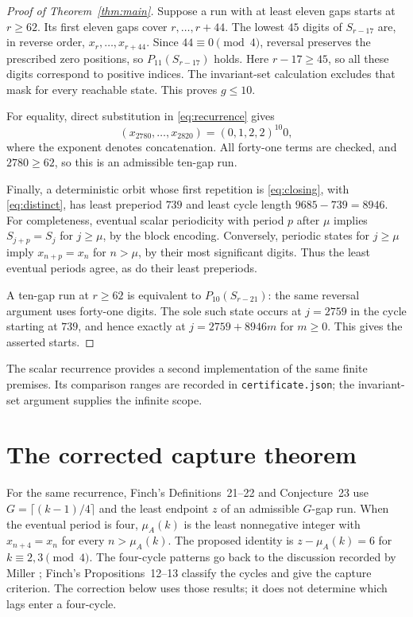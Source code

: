 \documentclass[11pt]{article}
\begin{document}
\begin{proof}[Proof of Theorem~\ref{thm:main}]
Suppose a run with at least eleven gaps starts at $r\ge62$.
Its first eleven gaps cover $r,\ldots,r+44$.
The lowest $45$ digits of $S_{r-17}$ are, in reverse order,
$x_r,\ldots,x_{r+44}$. Since $44\equiv0\pmod4$, reversal preserves
the prescribed zero positions, so $P_{11}(S_{r-17})$ holds.
Here $r-17\ge45$, so all these digits correspond to positive indices.
The invariant-set calculation excludes that mask for every reachable
state. This proves $g\le10$.

For equality, direct substitution in \eqref{eq:recurrence} gives
\[
 (x_{2780},\ldots,x_{2820})=(0,1,2,2)^{10}0,
\]
where the exponent denotes concatenation. All forty-one terms are
checked, and $2780\ge62$, so this is an admissible ten-gap run.

Finally, a deterministic orbit whose first repetition is
\eqref{eq:closing}, with \eqref{eq:distinct}, has least preperiod
$739$ and least cycle length $9685-739=8946$.
For completeness, eventual scalar periodicity with period $p$ after
$\mu$ implies $S_{j+p}=S_j$ for $j\ge\mu$, by the block encoding.
Conversely, periodic states for $j\ge\mu$ imply
$x_{n+p}=x_n$ for $n>\mu$, by their most significant digits.
Thus the least eventual periods agree, as do their least preperiods.

A ten-gap run at $r\ge62$ is equivalent to $P_{10}(S_{r-21})$:
the same reversal argument uses forty-one digits. The sole such
state occurs at $j=2759$ in the cycle starting at $739$, and hence
exactly at $j=2759+8946m$ for $m\ge0$. This gives the asserted starts.
\end{proof}

The scalar recurrence provides a second implementation of the same
finite premises. Its comparison ranges are recorded in
\texttt{certificate.json}; the invariant-set argument supplies the
infinite scope.

\section{The corrected capture theorem}
For the same recurrence, Finch's Definitions~21--22 and Conjecture~23
\cite[\S7, p.~9]{finch2026} use $G=\lceil(k-1)/4\rceil$ and the
least endpoint $z$ of an admissible $G$-gap run. When the eventual
period is four, $\mu_A(k)$ is the least nonnegative integer with
$x_{n+4}=x_n$ for every $n>\mu_A(k)$. The proposed identity is
$z-\mu_A(k)=6$ for $k\equiv2,3\pmod4$.
The four-cycle patterns go back to the discussion recorded by Miller
\cite{finchMO}; Finch's Propositions~12--13 \cite[\S4, p.~5]{finch2026}
classify the cycles and give the capture criterion. The correction
below uses those results; it does not determine which lags enter a
four-cycle.
\end{document}
